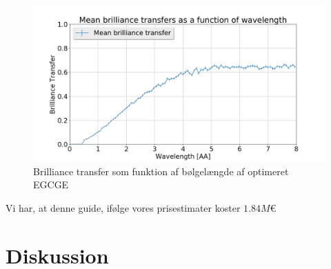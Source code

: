 \documentclass[12pt,oneside,a4paper]{article}
\begin{document}
{{{{{\begin{figure}[H]
\centering
\includegraphics[width=1\textwidth]{brill_optimized_mean_148957776280566.png}
\caption{Brilliance transfer som funktion af bølgelængde af optimeret EGCGE}
\end{figure}
Vi har, at denne guide, ifølge vores prisestimater koster $1.84M\text{€}$

\section{Diskussion}

}}}}}
\end{document}
